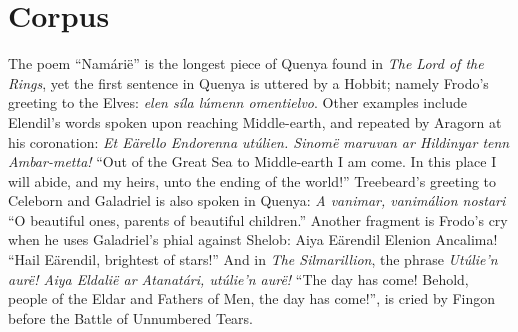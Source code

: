 \documentclass[pub]{apa6}
\begin{document}
\section{Corpus}
The poem ``Nam\'ari\"e'' is the longest piece of Quenya found in {\it The Lord of the Rings}, yet the first sentence in Quenya is uttered by a Hobbit; namely Frodo's greeting to the Elves: {\it elen s\'ila l\'umenn omentielvo}. Other examples include Elendil's words spoken upon reaching Middle-earth, and repeated by Aragorn at his coronation: {\it Et E\"arello Endorenna ut\'ulien. Sinom\"e maruvan ar Hildinyar tenn Ambar-metta!} ``Out of the Great Sea to Middle-earth I am come. In this place I will abide, and my heirs, unto the ending of the world!'' Treebeard's greeting to Celeborn and Galadriel is also spoken in Quenya: {\it A vanimar, vanim\'alion nostari} ``O beautiful ones, parents of beautiful children.'' Another fragment is Frodo's cry when he uses Galadriel's phial against Shelob: Aiya E\"arendil Elenion Ancalima! ``Hail E\"arendil, brightest of stars!'' And in {\it The Silmarillion}, the phrase {\it Ut\'ulie'n aur\"e! Aiya Eldali\"e ar Atanat\'ari, ut\'ulie'n aur\"e!} ``The day has come! Behold, people of the Eldar and Fathers of Men, the day has come!'', is cried by Fingon before the Battle of Unnumbered Tears.



\end{document}
